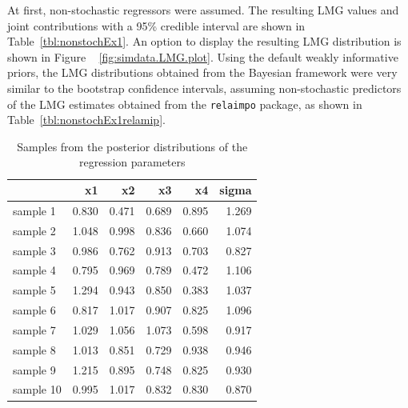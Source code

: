 \documentclass[11pt,a4paper,twoside]{book}\usepackage[]{graphicx}\usepackage[]{color}
\newenvironment{knitrout}{}{} %
\begin{document}
At first, non-stochastic regressors were assumed. The resulting LMG values and joint contributions with a 95\% credible interval are shown in Table~\ref{tbl:nonstochEx1}. An option to display the resulting LMG distribution is shown in Figure ~ \ref{fig:simdata.LMG.plot}.  Using the default weakly informative priors, the LMG distributions obtained from the Bayesian framework were very similar to the bootstrap confidence intervals, assuming non-stochastic predictors of the LMG estimates obtained from the \texttt{relaimpo} package, as shown in Table~\ref{tbl:nonstochEx1relamip}. 





\begin{knitrout}
\color{fgcolor}\begin{table}

\caption{\label{tab:simdata.postsample2}Samples from the posterior distributions of the regression parameters}
\centering
\begin{tabular}[t]{lrrrrr}
\toprule
  & x1 & x2 & x3 & x4 & sigma\\
\midrule
sample 1 & 0.830 & 0.471 & 0.689 & 0.895 & 1.269\\
sample 2 & 1.048 & 0.998 & 0.836 & 0.660 & 1.074\\
sample 3 & 0.986 & 0.762 & 0.913 & 0.703 & 0.827\\
sample 4 & 0.795 & 0.969 & 0.789 & 0.472 & 1.106\\
sample 5 & 1.294 & 0.943 & 0.850 & 0.383 & 1.037\\
sample 6 & 0.817 & 1.017 & 0.907 & 0.825 & 1.096\\
sample 7 & 1.029 & 1.056 & 1.073 & 0.598 & 0.917\\
sample 8 & 1.013 & 0.851 & 0.729 & 0.938 & 0.946\\
sample 9 & 1.215 & 0.895 & 0.748 & 0.825 & 0.930\\
sample 10 & 0.995 & 1.017 & 0.832 & 0.830 & 0.870\\
\bottomrule
\end{tabular}
\end{table}


\end{knitrout}
\end{document}
